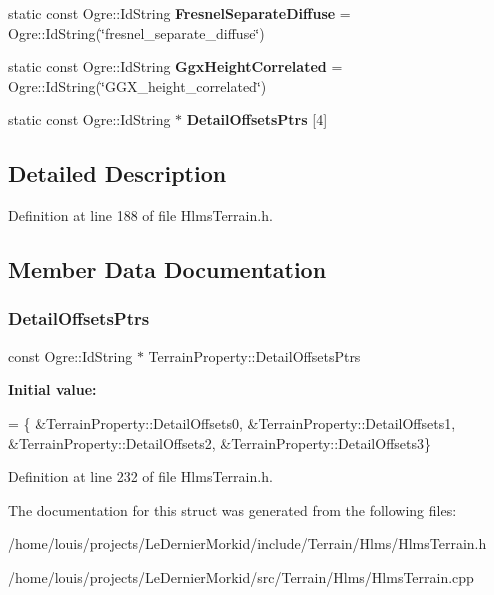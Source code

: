 \begin{DoxyCompactItemize}
static const Ogre\+::\+Id\+String {\bfseries Fresnel\+Separate\+Diffuse} = Ogre\+::\+Id\+String(\char`\"{}fresnel\+\_\+separate\+\_\+diffuse\char`\"{})
\item 
\mbox{\label{struct_terrain_property_ac5d4c929036f2bdb2959da73f70a2ab6}} 
static const Ogre\+::\+Id\+String {\bfseries Ggx\+Height\+Correlated} = Ogre\+::\+Id\+String(\char`\"{}G\+G\+X\+\_\+height\+\_\+correlated\char`\"{})
\item 
static const Ogre\+::\+Id\+String $\ast$ {\bfseries Detail\+Offsets\+Ptrs} \mbox{[}4\mbox{]}
\end{DoxyCompactItemize}


\subsection{Detailed Description}


Definition at line 188 of file Hlms\+Terrain.\+h.



\subsection{Member Data Documentation}
\mbox{\label{struct_terrain_property_ac7f6e9bf302538090e3c9155799304b8}} 
\subsubsection{\texorpdfstring{Detail\+Offsets\+Ptrs}{DetailOffsetsPtrs}}
{\footnotesize\ttfamily const Ogre\+::\+Id\+String $\ast$ Terrain\+Property\+::\+Detail\+Offsets\+Ptrs\hspace{0.3cm}{\ttfamily [static]}}

{\bfseries Initial value\+:}
\begin{DoxyCode}
=
        \{
                &TerrainProperty::DetailOffsets0,
                &TerrainProperty::DetailOffsets1,
                &TerrainProperty::DetailOffsets2,
                &TerrainProperty::DetailOffsets3\}
\end{DoxyCode}


Definition at line 232 of file Hlms\+Terrain.\+h.



The documentation for this struct was generated from the following files\+:\begin{DoxyCompactItemize}
\item 
/home/louis/projects/\+Le\+Dernier\+Morkid/include/\+Terrain/\+Hlms/Hlms\+Terrain.\+h\item 
/home/louis/projects/\+Le\+Dernier\+Morkid/src/\+Terrain/\+Hlms/Hlms\+Terrain.\+cpp\end{DoxyCompactItemize}

